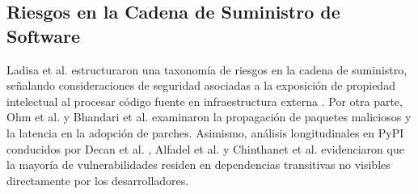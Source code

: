 \documentclass[conference]{IEEEtran}
\begin{document}
\subsection{Riesgos en la Cadena de Suministro de Software}
Ladisa et al. \cite{ladisa2023sok} estructuraron una taxonomía de riesgos en la cadena de suministro, señalando consideraciones de seguridad asociadas a la exposición de propiedad intelectual al procesar código fuente en infraestructura externa \cite{ladisa2023sok}. Por otra parte, Ohm et al. \cite{ohm2022sok} y Bhandari et al. \cite{bhandari2022cvefixes} examinaron la propagación de paquetes maliciosos y la latencia en la adopción de parches. Asimismo, análisis longitudinales en PyPI conducidos por Decan et al. \cite{decan2019empirical}, Alfadel et al. \cite{alfadel2023empirical} y Chinthanet et al. \cite{chinthanet2023lag} evidenciaron que la mayoría de vulnerabilidades residen en dependencias transitivas no visibles directamente por los desarrolladores.
\end{document}
